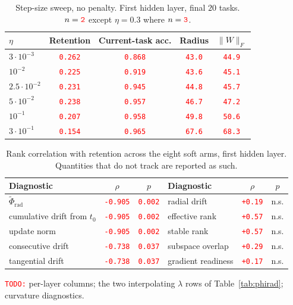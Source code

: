 \documentclass[anon]{opt2026}     %
\newcommand{\PH}[1]{\textcolor{red}{\texttt{#1}}}   %
\newcommand{\phirad}{\tilde{\Phi}_{\mathrm{rad}}}
\begin{document}
\begin{table}[!tb]
\centering
\caption{Step-size sweep, no penalty. First hidden layer, final $20$ tasks.
$n = \PH{2}$ except $\eta = 0.3$ where $n = \PH{3}$.}
\label{tab:lrfull}
\small
\begin{tabular}{lcccc}
\toprule
$\eta$ & Retention & Current-task acc. & Radius & $\|W\|_F$ \\
\midrule
$3\cdot10^{-3}$ & \PH{0.262} & \PH{0.868} & \PH{43.0} & \PH{44.9} \\
$10^{-2}$       & \PH{0.225} & \PH{0.919} & \PH{43.6} & \PH{45.1} \\
$2.5\cdot10^{-2}$ & \PH{0.231} & \PH{0.945} & \PH{44.8} & \PH{45.7} \\
$5\cdot10^{-2}$ & \PH{0.238} & \PH{0.957} & \PH{46.7} & \PH{47.2} \\
$10^{-1}$       & \PH{0.207} & \PH{0.958} & \PH{49.8} & \PH{50.6} \\
$3\cdot10^{-1}$ & \PH{0.154} & \PH{0.965} & \PH{67.6} & \PH{68.3} \\
\bottomrule
\end{tabular}
\end{table}

\begin{table}[!tb]
\centering
\caption{Rank correlation with retention across the eight soft arms, first
hidden layer. Quantities that do not track are reported as such.}
\label{tab:battery}
\small
\begin{tabular}{lcc|lcc}
\toprule
Diagnostic & $\rho$ & $p$ & Diagnostic & $\rho$ & $p$ \\
\midrule
$\phirad$                 & \PH{-0.905} & \PH{0.002} & radial drift        & \PH{+0.19} & n.s. \\
cumulative drift from $t_0$ & \PH{-0.905} & \PH{0.002} & effective rank      & \PH{+0.57} & n.s. \\
update norm               & \PH{-0.905} & \PH{0.002} & stable rank         & \PH{+0.57} & n.s. \\
consecutive drift         & \PH{-0.738} & \PH{0.037} & subspace overlap    & \PH{+0.29} & n.s. \\
tangential drift          & \PH{-0.738} & \PH{0.037} & gradient readiness  & \PH{+0.17} & n.s. \\
\bottomrule
\end{tabular}
\end{table}

\PH{TODO:} per-layer columns; the two interpolating $\lambda$ rows of
Table~\ref{tab:phirad}; curvature diagnostics.
\end{document}
